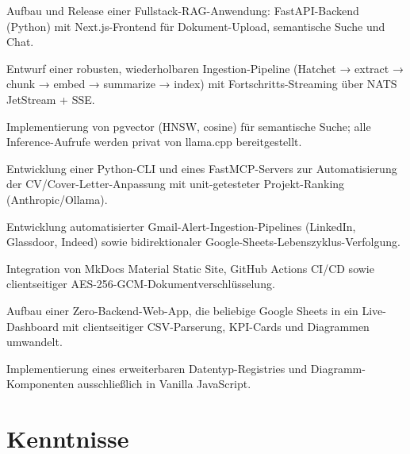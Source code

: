 \documentclass[10pt,a4paper]{resume}
\begin{document}
\bullets
  \item Aufbau und Release einer Fullstack-RAG-Anwendung: FastAPI-Backend (Python) mit Next.js-Frontend für Dokument-Upload, semantische Suche und Chat.
  \item Entwurf einer robusten, wiederholbaren Ingestion-Pipeline (Hatchet → extract → chunk → embed → summarize → index) mit Fortschritts-Streaming über NATS JetStream + SSE.
  \item Implementierung von pgvector (HNSW, cosine) für semantische Suche; alle Inference-Aufrufe werden privat von llama.cpp bereitgestellt.
\bulletsend
\vspace{1.0pt}
\bullets
  \item Entwicklung einer Python-CLI und eines FastMCP-Servers zur Automatisierung der CV/Cover-Letter-Anpassung mit unit-getesteter Projekt-Ranking (Anthropic/Ollama).
  \item Entwicklung automatisierter Gmail-Alert-Ingestion-Pipelines (LinkedIn, Glassdoor, Indeed) sowie bidirektionaler Google-Sheets-Lebenszyklus-Verfolgung.
  \item Integration von MkDocs Material Static Site, GitHub Actions CI/CD sowie clientseitiger AES-256-GCM-Dokumentverschlüsselung.
\bulletsend
\vspace{1.0pt}
\bullets
  \item Aufbau einer Zero-Backend-Web-App, die beliebige Google Sheets in ein Live-Dashboard mit clientseitiger CSV-Parserung, KPI-Cards und Diagrammen umwandelt.
  \item Implementierung eines erweiterbaren Datentyp-Registries und Diagramm-Komponenten ausschließlich in Vanilla JavaScript.
\bulletsend

\section{Kenntnisse}
\end{document}
